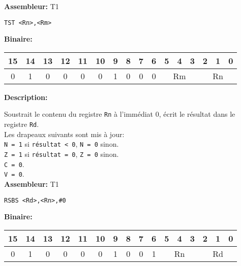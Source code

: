 \documentclass{article}
\begin{document}
    \textbf{Assembleur:} T1

    \begin{lstlisting}
TST <Rn>,<Rm>
    \end{lstlisting}

    \textbf{Binaire:}\\

    \begin{tabular}{| c c c c c c c c c c c c c c c c |}
        \hline
        15 & 14 & 13 & 12 & 11 & 10 & \multicolumn{1}{|c}{9} & 8 & 7 & 6 & \multicolumn{1}{|c}{5} & 4 & 3 & \multicolumn{1}{|c}{2} & 1 & 0 \\
        \hline
        0 & 1 & 0 & 0 & 0 & 0 & \multicolumn{1}{|c}{1} & 0 & 0 & 0 & \multicolumn{3}{|c}{Rm} & \multicolumn{3}{|c|}{Rn} \\
        \hline
    \end{tabular}




    \textbf{Description: }

    Soustrait le contenu du registre \texttt{Rn} à l'immédiat 0, écrit le résultat dans le registre \texttt{Rd}.\\
    Les drapeaux suivants sont mis à jour:\\
    \texttt{N = 1} si \texttt{résultat < 0}, \texttt{N = 0} sinon.\\
    \texttt{Z = 1} si \texttt{résultat = 0}, \texttt{Z = 0} sinon.\\
    \texttt{C = 0}.\\
    \texttt{V = 0}.\\

    \textbf{Assembleur:} T1

    \begin{lstlisting}
RSBS <Rd>,<Rn>,#0
    \end{lstlisting}

    \textbf{Binaire:}\\

    \begin{tabular}{| c c c c c c c c c c c c c c c c |}
        \hline
        15 & 14 & 13 & 12 & 11 & 10 & \multicolumn{1}{|c}{9} & 8 & 7 & 6 & \multicolumn{1}{|c}{5} & 4 & 3 & \multicolumn{1}{|c}{2} & 1 & 0 \\
        \hline
        0 & 1 & 0 & 0 & 0 & 0 & \multicolumn{1}{|c}{1} & 0 & 0 & 1 & \multicolumn{3}{|c}{Rn} & \multicolumn{3}{|c|}{Rd} \\
        \hline
    \end{tabular}
\end{document}
